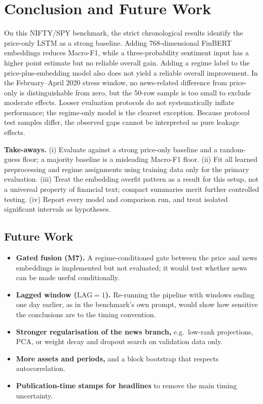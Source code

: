 \newpage
\section{Conclusion and Future Work}\label{ch:conclusion}
On this NIFTY/SPY benchmark, the strict chronological results identify the price-only LSTM as a strong baseline. Adding 768-dimensional FinBERT embeddings reduces Macro-F1, while a three-probability sentiment input has a higher point estimate but no reliable overall gain. Adding a regime label to the price-plus-embedding model also does not yield a reliable overall improvement. In the February--April 2020 stress window, no news-related difference from price-only is distinguishable from zero, but the 50-row sample is too small to exclude moderate effects. Looser evaluation protocols do not systematically inflate performance; the regime-only model is the clearest exception. Because protocol test samples differ, the observed gaps cannot be interpreted as pure leakage effects.

\begin{keybox}
\textbf{Take-aways.}
(i) Evaluate against a strong price-only baseline and a random-guess floor; a majority baseline is a misleading Macro-F1 floor.
(ii) Fit all learned preprocessing and regime assignments using training data only for the primary evaluation.
(iii) Treat the embedding overfit pattern as a result for this setup, not a universal property of financial text; compact summaries merit further controlled testing.
(iv) Report every model and comparison run, and treat isolated significant intervals as hypotheses.
\end{keybox}
\subsection{Future Work}
\begin{itemize}
\item \textbf{Gated fusion (M7).} A regime-conditioned gate between the price and news embeddings is implemented but not evaluated; it would test whether news can be made useful conditionally.
\item \textbf{Lagged window ($\mathrm{LAG}=1$).} Re-running the pipeline with windows ending one day earlier, as in the benchmark's own prompt, would show how sensitive the conclusions are to the timing convention.
\item \textbf{Stronger regularisation of the news branch,} e.g.\ low-rank projections, PCA, or weight decay and dropout search on validation data only.
\item \textbf{More assets and periods,} and a block bootstrap that respects autocorrelation.
\item \textbf{Publication-time stamps for headlines} to remove the main timing uncertainty.
\end{itemize}
